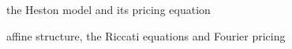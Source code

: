\begin{planned}
  \item the Heston model and its pricing equation
  \item affine structure, the Riccati equations and Fourier pricing
\end{planned}
